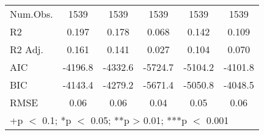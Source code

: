 \begin{table}
\begin{tabular}[t]{lccccc}
Num.Obs. & 1539 & 1539 & 1539 & 1539 & 1539\\
R2 & 0.197 & 0.178 & 0.068 & 0.142 & 0.109\\
R2 Adj. & 0.161 & 0.141 & 0.027 & 0.104 & 0.070\\
AIC & -4196.8 & -4332.6 & -5724.7 & -5104.2 & -4101.8\\
BIC & -4143.4 & -4279.2 & -5671.4 & -5050.8 & -4048.5\\
RMSE & 0.06 & 0.06 & 0.04 & 0.05 & 0.06\\
\bottomrule
\multicolumn{6}{l}{\rule{0pt}{1em}+p $<$ 0.1; *p $<$ 0.05; **p > 0.01; ***p $<$ 0.001}\\
\end{tabular}
\end{table}
